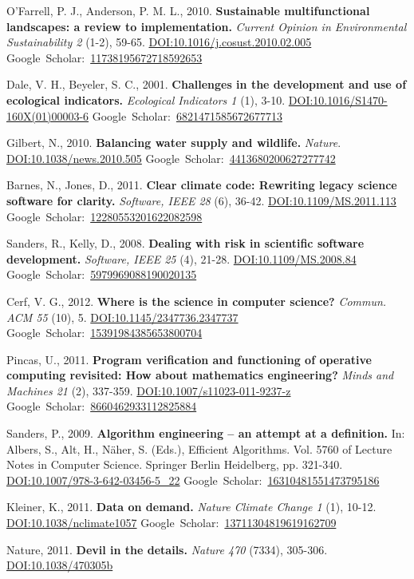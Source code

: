 \documentclass[a4paper,11pt]{article}
\newcommand{\goDOI}[1]{\href{http://dx.doi.org/#1}{DOI:#1}}
\newcommand{\goScholar}[1]{{Google~Scholar}:~\href{http://scholar.google.com/scholar?cluster=#1}{#1}}
\begin{document}
\begin{footnotesize}
{\begin{thebibliography}{}
 O'Farrell, P. J., Anderson, P. M. L., 2010. \textbf{Sustainable multifunctional landscapes: a review to implementation.} \emph{Current Opinion in Environmental Sustainability 2} (1-2), 59-65. \goDOI{10.1016/j.cosust.2010.02.005} \goScholar{11738195672718592653}

 Dale, V. H., Beyeler, S. C., 2001. \textbf{Challenges in the development and use of ecological indicators.} \emph{Ecological Indicators 1} (1), 3-10. \goDOI{10.1016/S1470-160X(01)00003-6} \goScholar{6821471585672677713}

 Gilbert, N., 2010. \textbf{Balancing water supply and wildlife.} \emph{Nature}. \goDOI{10.1038/news.2010.505} \goScholar{4413680200627277742}

 Barnes, N., Jones, D., 2011. \textbf{Clear climate code: Rewriting legacy science software for clarity.} \emph{Software, IEEE 28} (6), 36-42. \goDOI{10.1109/MS.2011.113} \goScholar{12280553201622082598}


 Sanders, R., Kelly, D., 2008. \textbf{Dealing with risk in scientific software development.} \emph{Software, IEEE 25} (4), 21-28. \goDOI{10.1109/MS.2008.84} \goScholar{5979969088190020135}

 Cerf, V. G., 2012. \textbf{Where is the science in computer science?} \emph{Commun. ACM 55} (10), 5. \goDOI{10.1145/2347736.2347737} \goScholar{15391984385653800704}

 Pincas, U., 2011. \textbf{Program verification and functioning of operative computing revisited: How about mathematics engineering?} \emph{Minds and Machines 21} (2), 337-359. \goDOI{10.1007/s11023-011-9237-z} \goScholar{8660462933112825884}

 Sanders, P., 2009. \textbf{Algorithm engineering -- an attempt at a definition.} In: Albers, S., Alt, H., N\"aher, S. (Eds.), Efficient Algorithms. Vol. 5760 of Lecture Notes in Computer Science. Springer Berlin Heidelberg, pp. 321-340. \goDOI{10.1007/978-3-642-03456-5\_22} \goScholar{16310481551473795186}

 Kleiner, K., 2011. \textbf{Data on demand.} \emph{Nature Climate Change 1} (1), 10-12. \goDOI{10.1038/nclimate1057} \goScholar{13711304819619162709}

 Nature, 2011. \textbf{Devil in the details.} \emph{Nature 470} (7334), 305-306. \goDOI{10.1038/470305b}


\end{thebibliography}}
\end{footnotesize}
\end{document}
